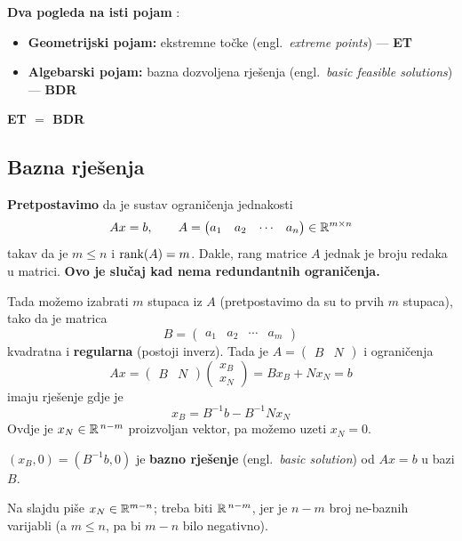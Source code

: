 \textbf{Dva pogleda na isti pojam} :
\begin{itemize}
  \item \textbf{Geometrijski pojam:} ekstremne točke (engl.\ \emph{extreme
        points}) --- \textbf{ET}
  \item \textbf{Algebarski pojam:} bazna dozvoljena rješenja (engl.\
        \emph{basic feasible solutions}) --- \textbf{BDR}
\end{itemize}

\begin{teorem}[\str{15}]
\textbf{ET $=$ BDR}
\end{teorem}

\subsection{Bazna rješenja}

\textbf{Pretpostavimo} da je sustav ograničenja jednakosti
\[
Ax = b, \qquad
A = \begin{pmatrix} a_1 & a_2 & \cdots & a_n \end{pmatrix} \in \mathbb{R}^{m\times n}
\]
takav da je $m \le n$ i $\operatorname{rank}(A) = m$. Dakle, rang matrice $A$ jednak je broju
redaka u matrici. \textbf{Ovo je slučaj kad nema redundantnih ograničenja.}

Tada možemo izabrati $m$ stupaca iz $A$ (pretpostavimo da su to prvih $m$
stupaca), tako da je matrica
\[
B = \begin{pmatrix} a_1 & a_2 & \cdots & a_m \end{pmatrix}
\]
kvadratna i \textbf{regularna} (postoji inverz). Tada je
$A = \begin{pmatrix} B & N\end{pmatrix}$ i ograničenja
\[
Ax = \begin{pmatrix} B & N\end{pmatrix}
\begin{pmatrix} x_B \\ x_N \end{pmatrix} = Bx_B + Nx_N = b
\]
imaju rješenje gdje je
\[
x_B = B^{-1}b - B^{-1}Nx_N
\]
Ovdje je $x_N \in \mathbb{R}^{\,n-m}$ proizvoljan vektor, pa možemo uzeti $x_N = 0$.

\begin{definicija}
$(x_B, 0) = (B^{-1}b, 0)$ je \textbf{bazno rješenje} (engl.\ \emph{basic
solution}) od $Ax = b$ u bazi $B$.
\end{definicija}

\begin{napomena}
Na slajdu piše $x_N \in \mathbb{R}^{m-n}$; treba biti $\mathbb{R}^{\,n-m}$, jer je $n-m$ broj
ne-baznih varijabli (a $m \le n$, pa bi $m-n$ bilo negativno).
\end{napomena}

